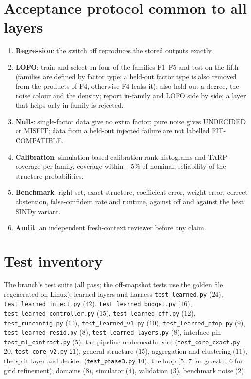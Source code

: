 \documentclass[11pt]{article}
\theoremstyle{plain}
\theoremstyle{definition}
\theoremstyle{remark}
\newcommand{\lab}[1]{\textsf{#1}}           %
\newcommand{\FC}{\lab{FIT-COMPATIBLE}}
\newcommand{\MIS}{\lab{MISFIT}}
\newcommand{\UND}{\lab{UNDECIDED}}
\begin{document}
\section{Acceptance protocol common to all layers}\label{app:acceptance}
\begin{enumerate}
\item \textbf{Regression}: the switch off reproduces the stored outputs exactly.
\item \textbf{LOFO}: train and select on four of the families F1--F5 and test on the fifth (families are defined by factor type; a held-out factor type is also removed from the products of F4, otherwise F4 leaks it); also hold out a degree, the noise colour and the density; report in-family and LOFO side by side; a layer that helps only in-family is rejected.
\item \textbf{Nulls}: single-factor data give no extra factor; pure noise gives \UND{} or \MIS; data from a held-out injected failure are not labelled \FC.
\item \textbf{Calibration}: simulation-based calibration rank histograms and TARP coverage per family, coverage within $\pm5\%$ of nominal, reliability of the structure probabilities.
\item \textbf{Benchmark}: right set, exact structure, coefficient error, weight error, correct abstention, false-confident rate and runtime, against off and against the best SINDy variant.
\item \textbf{Audit}: an independent fresh-context reviewer before any claim.
\end{enumerate}

\section{Test inventory}\label{app:tests}
The branch's test suite (all pass; the off-snapshot tests use the golden file regenerated on Linux): learned layers and harness \texttt{test\_learned.py} ($24$), \texttt{test\_learned\_inject.py} ($42$), \texttt{test\_learned\_budget.py} ($16$), \texttt{test\_learned\_controller.py} ($15$), \texttt{test\_learned\_off.py} ($12$), \texttt{test\_runconfig.py} ($10$), \texttt{test\_learned\_v1.py} ($10$), \texttt{test\_learned\_ptop.py} ($9$), \texttt{test\_learned\_resid.py} ($8$), \texttt{test\_learned\_layers.py} ($8$), interface pin \texttt{test\_ml\_contract.py} ($5$);
the pipeline underneath: core (\texttt{test\_core\_exact.py} $20$, \texttt{test\_core\_v2.py} $21$), general structure ($15$), aggregation and clustering ($11$), the split layer and decider (\texttt{test\_phase3.py} $10$), the loop ($5$, $7$ for growth, $6$ for grid refinement), domains ($8$), simulator ($4$), validation ($3$), benchmark noise ($2$).
\end{document}

